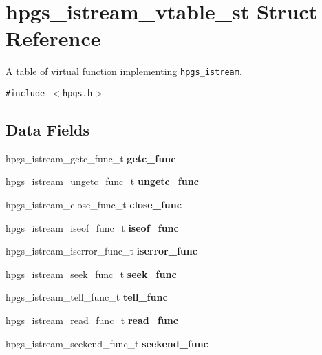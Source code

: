 \section{hpgs\_\-istream\_\-vtable\_\-st Struct Reference}
\label{structhpgs__istream__vtable__st}
A table of virtual function implementing {\tt hpgs\_\-istream}.  


{\tt \#include $<$hpgs.h$>$}

\subsection*{Data Fields}
\begin{CompactItemize}
\item 
hpgs\_\-istream\_\-getc\_\-func\_\-t \textbf{getc\_\-func}\label{structhpgs__istream__vtable__st_260d523436d5f2478c7e883bbf9f6a37}

\item 
hpgs\_\-istream\_\-ungetc\_\-func\_\-t \textbf{ungetc\_\-func}\label{structhpgs__istream__vtable__st_8a292ec2864ce186e3c31f4ff917c503}

\item 
hpgs\_\-istream\_\-close\_\-func\_\-t \textbf{close\_\-func}\label{structhpgs__istream__vtable__st_fad6748b700b7c7aee53b4f359bd7ffc}

\item 
hpgs\_\-istream\_\-iseof\_\-func\_\-t \textbf{iseof\_\-func}\label{structhpgs__istream__vtable__st_d3f5691c2b2892aa36316ec3937bc145}

\item 
hpgs\_\-istream\_\-iserror\_\-func\_\-t \textbf{iserror\_\-func}\label{structhpgs__istream__vtable__st_f979e747612a5c0144765c3d37b45bb1}

\item 
hpgs\_\-istream\_\-seek\_\-func\_\-t \textbf{seek\_\-func}\label{structhpgs__istream__vtable__st_24b8c3a9dc3d979a23dcee8f8f74158d}

\item 
hpgs\_\-istream\_\-tell\_\-func\_\-t \textbf{tell\_\-func}\label{structhpgs__istream__vtable__st_5e9794f509cac8aad8d54d3c366a9146}

\item 
hpgs\_\-istream\_\-read\_\-func\_\-t \textbf{read\_\-func}\label{structhpgs__istream__vtable__st_8eab3348684d885e14105658214c1cd2}

\item 
hpgs\_\-istream\_\-seekend\_\-func\_\-t \textbf{seekend\_\-func}\label{structhpgs__istream__vtable__st_c4b2e3f6f7ddf9ea4aa7cb9d668b5d71}

\end{CompactItemize}


